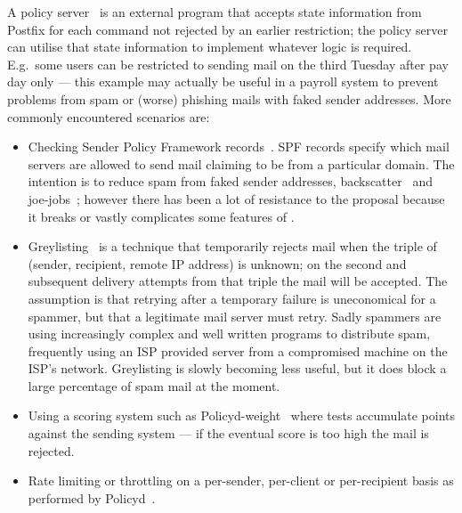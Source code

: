 \documentclass[a4paper,12pt,draft]{article}
\begin{document}
A policy server~\cite{policy-servers} is an external program that accepts
state information from Postfix for each \SMTP{} command not rejected by an
earlier restriction; the policy server can utilise that state information
to implement whatever logic is required.  E.g.\ some users can be
restricted to sending mail on the third Tuesday after pay day only --- this
example may actually be useful in a payroll system to prevent problems from
spam or (worse) phishing mails with faked sender addresses.  More commonly
encountered scenarios are:

\begin{itemize}

    \item Checking Sender Policy Framework records~\cite{openspf,
        wikipedia-spf}.  SPF records specify which mail servers are allowed
        to send mail claiming to be from a particular domain.  The
        intention is to reduce spam from faked sender addresses,
        backscatter~\cite{postfix-backscatter} and
        joe-jobs~\cite{wikipedia-joe-job}; however there has been a lot of
        resistance to the proposal because it breaks or vastly complicates
        some features of \SMTP{}\@.

    \item Greylisting~\cite{greylisting} is a technique that temporarily
        rejects mail when the triple of (sender, recipient, remote IP
        address) is unknown; on the second and subsequent delivery attempts
        from that triple the mail will be accepted.  The assumption is that
        retrying after a temporary failure is uneconomical for a spammer,
        but that a legitimate mail server must retry.  Sadly spammers are
        using increasingly complex and well written programs to distribute
        spam, frequently using an ISP provided \SMTP{} server from a
        compromised machine on the ISP's network.  Greylisting is slowly
        becoming less useful, but it does block a large percentage of spam
        mail at the moment.

    \item Using a scoring system such as
        Policyd-weight~\cite{policyd-weight} where tests accumulate points
        against the sending system --- if the eventual score is too high
        the mail is rejected.
        
    \item Rate limiting or throttling on a per-sender, per-client or
        per-recipient basis as performed by Policyd~\cite{policyd}.

\end{itemize}
\end{document}
